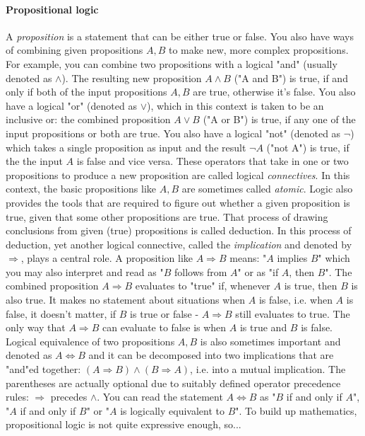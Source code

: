 \paragraph{Propositional logic} A \emph{proposition} is a statement that can be either true or false. You also have ways of combining given propositions $A,B$ to make new, more complex propositions. For example, you can combine two propositions with a logical "and" (usually denoted as $\wedge$). The resulting new proposition $A \wedge B$ ("A and B") is true, if and only if both of the input propositions $A,B$ are true, otherwise it's false. You also have a logical "or" (denoted as $\vee$), which in this context is taken to be an inclusive or: the combined proposition $A \vee B$ ("A or B") is true, if any one of the input propositions or both are true. You also have a logical "not" (denoted as $\neg$) which takes a single proposition as input and the result $\neg A$ ("not A") is true, if the the input $A$ is false and vice versa. These operators that take in one or two propositions to produce a new proposition are called logical \emph{connectives}. In this context, the basic propositions like $A,B$ are sometimes called \emph{atomic}. Logic also provides the tools that are required to figure out whether a given proposition is true, given that some other propositions are true. That process of drawing conclusions from given (true) propositions is called deduction. In this process of deduction, yet another logical connective, called the \emph{implication} and denoted by $\Rightarrow$, plays a central role. A proposition like $A \Rightarrow B$ means: "$A$ implies $B$" which you may also interpret and read as "$B$ follows from $A$" or as "if $A$, then $B$". The combined proposition $A \Rightarrow B$ evaluates to "true" if, whenever $A$ is true, then $B$ is also true. It makes no statement about situations when $A$ is false, i.e. when $A$ is false, it doesn't matter, if $B$ is true or false - $A \Rightarrow B$ still evaluates to true. The only way that $A \Rightarrow B$ can evaluate to false is when $A$ is true and $B$ is false. Logical equivalence of two propositions $A,B$ is also sometimes important and denoted as $A \Leftrightarrow B$ and it can be decomposed into two implications that are "and"ed together: $(A \Rightarrow B) \wedge (B \Rightarrow A)$, i.e. into a mutual implication. The parentheses are actually optional due to suitably defined operator precedence rules: $\Rightarrow$ precedes $\wedge$. You can read the statement $A \Leftrightarrow B$ as "$B$ if and only if $A$", "$A$ if and only if $B$" or "$A$ is logically equivalent to $B$". To build up mathematics, propositional logic is not quite expressive enough, so...

